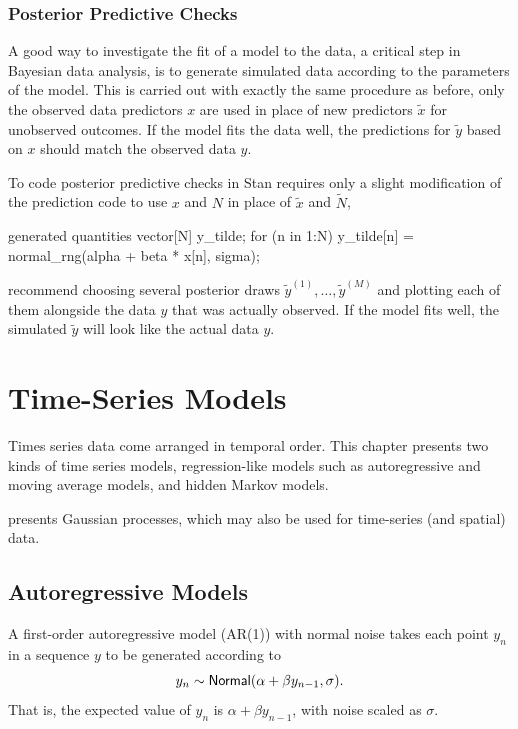 \subsection{Posterior Predictive Checks}

A good way to investigate the fit of a model to the data, a critical
step in Bayesian data analysis, is to generate simulated data
according to the parameters of the model.  This is carried out with
exactly the same procedure as before, only the observed data
predictors $x$ are used in place of new predictors $\tilde{x}$ for
unobserved outcomes.  If the model fits the data well, the predictions
for $\tilde{y}$ based on $x$ should match the observed data $y$.

To code posterior predictive checks in Stan requires only a slight
modification of the prediction code to use $x$ and $N$ in place of
$\tilde{x}$ and $\tilde{N}$,
%
\begin{stancode}
generated quantities {
  vector[N] y_tilde;
  for (n in 1:N)
    y_tilde[n] = normal_rng(alpha + beta * x[n], sigma);
}
\end{stancode}
%
\cite{GelmanEtAl:2013} recommend choosing several posterior draws
$\tilde{y}^{(1)}, \ldots, \tilde{y}^{(M)}$ and plotting each of them
alongside the data $y$ that was actually observed.  If the model fits
well, the simulated $\tilde{y}$ will look like the actual data $y$.




\chapter{Time-Series Models}\label{time-series.chapter}

\noindent
Times series data come arranged in temporal order.  This chapter
presents two kinds of time series models, regression-like models such
as autoregressive and moving average models, and hidden Markov models.

 presents Gaussian processes, which may
also be used for time-series (and spatial) data.


\section{Autoregressive Models}\label{autoregressive.section}

A first-order autoregressive model (AR(1)) with normal noise takes
each point $y_n$ in a sequence $y$ to be generated according to
%
\[
y_n \sim \mbox{\sf Normal}(\alpha + \beta y_{n-1}, \sigma).
\]
%
That is, the expected value of $y_n$ is $\alpha + \beta y_{n-1}$, with
noise scaled as $\sigma$.

